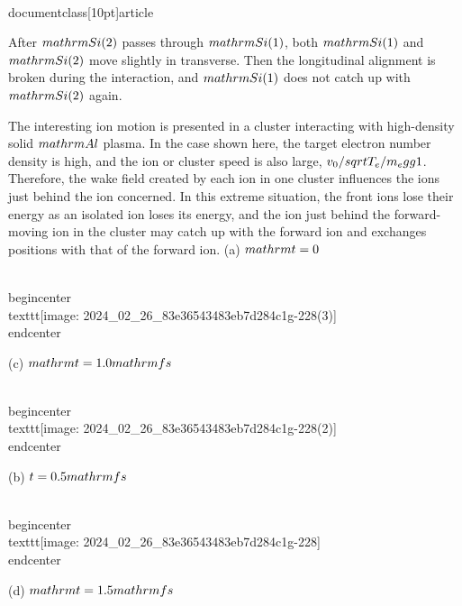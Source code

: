 \\documentclass[10pt]{article}
\begin{document}
{{{{{{After $\\mathrm{Si}(2)$ passes through $\\mathrm{Si}(1)$, both $\\mathrm{Si}(1)$ and $\\mathrm{Si}(2)$ move slightly in transverse. Then the longitudinal alignment is broken during the interaction, and $\\mathrm{Si}(1)$ does not catch up with $\\mathrm{Si}(2)$ again.

The interesting ion motion is presented in a cluster interacting with high-density solid $\\mathrm{Al}$ plasma. In the case shown here, the target electron number density is high, and the ion or cluster speed is also large, $v_{0} / \\sqrt{T_{e} / m_{e}} \\gg 1$. Therefore, the wake field created by each ion in one cluster influences the ions just behind the ion concerned. In this extreme situation, the front ions lose their energy as an isolated ion loses its energy, and the ion just behind the forward-moving ion in the cluster may catch up with the forward ion and exchanges positions with that of the forward ion.
(a) $\\mathrm{t}=0$

\\begin{center}
\\texttt{[image: 2024\_02\_26\_83e36543483eb7d284c1g-228(3)]}
\\end{center}

(c) $\\mathrm{t}=1.0 \\mathrm{fs}$

\\begin{center}
\\texttt{[image: 2024\_02\_26\_83e36543483eb7d284c1g-228(2)]}
\\end{center}

(b) $t=0.5 \\mathrm{fs}$

\\begin{center}
\\texttt{[image: 2024\_02\_26\_83e36543483eb7d284c1g-228]}
\\end{center}

(d) $\\mathrm{t}=1.5 \\mathrm{fs}$

}}}}}}
\end{document}
